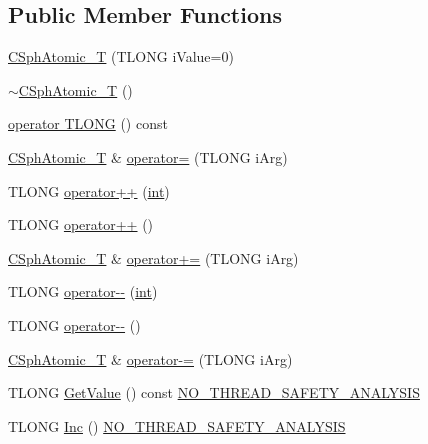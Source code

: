 \subsection*{Public Member Functions}
\begin{DoxyCompactItemize}
\item 
\hyperlink{classCSphAtomic__T_a951b4fc86490f5d5c7f7cdeedf9a681e}{C\-Sph\-Atomic\-\_\-\-T} (T\-L\-O\-N\-G i\-Value=0)
\item 
\hyperlink{classCSphAtomic__T_a15878abbac31d3e016ce589e639a30a7}{$\sim$\-C\-Sph\-Atomic\-\_\-\-T} ()
\item 
\hyperlink{classCSphAtomic__T_a894ae7603d1be2b3c533688002208b48}{operator T\-L\-O\-N\-G} () const 
\item 
\hyperlink{classCSphAtomic__T}{C\-Sph\-Atomic\-\_\-\-T} \& \hyperlink{classCSphAtomic__T_a084846ae76b22b3c40e1ef48fb11053e}{operator=} (T\-L\-O\-N\-G i\-Arg)
\item 
T\-L\-O\-N\-G \hyperlink{classCSphAtomic__T_a2bd4f9eedbfacdf3134f5cd0744a7c69}{operator++} (\hyperlink{sphinxexpr_8cpp_a4a26e8f9cb8b736e0c4cbf4d16de985e}{int})
\item 
T\-L\-O\-N\-G \hyperlink{classCSphAtomic__T_a09e2c6cdfe0f87c086ebb08515399ba2}{operator++} ()
\item 
\hyperlink{classCSphAtomic__T}{C\-Sph\-Atomic\-\_\-\-T} \& \hyperlink{classCSphAtomic__T_acabe4751e1ca0d0521ad6b25bf97eb0e}{operator+=} (T\-L\-O\-N\-G i\-Arg)
\item 
T\-L\-O\-N\-G \hyperlink{classCSphAtomic__T_ad195703d2a868f96cbaad4c536ba36be}{operator-\/-\/} (\hyperlink{sphinxexpr_8cpp_a4a26e8f9cb8b736e0c4cbf4d16de985e}{int})
\item 
T\-L\-O\-N\-G \hyperlink{classCSphAtomic__T_a149f7478688191a35fb9dc54c0fe86dc}{operator-\/-\/} ()
\item 
\hyperlink{classCSphAtomic__T}{C\-Sph\-Atomic\-\_\-\-T} \& \hyperlink{classCSphAtomic__T_ae251c82503a3d927ed2851c3c3abb23a}{operator-\/=} (T\-L\-O\-N\-G i\-Arg)
\item 
T\-L\-O\-N\-G \hyperlink{classCSphAtomic__T_a89df3a30a6a8be3982091d2f1e9ea1f6}{Get\-Value} () const \hyperlink{sphinxstd_8h_ab8ec653d80c013941ef73e4c80cd44cf}{N\-O\-\_\-\-T\-H\-R\-E\-A\-D\-\_\-\-S\-A\-F\-E\-T\-Y\-\_\-\-A\-N\-A\-L\-Y\-S\-I\-S}
\item 
T\-L\-O\-N\-G \hyperlink{classCSphAtomic__T_aa9d81aa5ec3a9ac220f898295bb0dc14}{Inc} () \hyperlink{sphinxstd_8h_ab8ec653d80c013941ef73e4c80cd44cf}{N\-O\-\_\-\-T\-H\-R\-E\-A\-D\-\_\-\-S\-A\-F\-E\-T\-Y\-\_\-\-A\-N\-A\-L\-Y\-S\-I\-S}

\end{DoxyCompactItemize}
